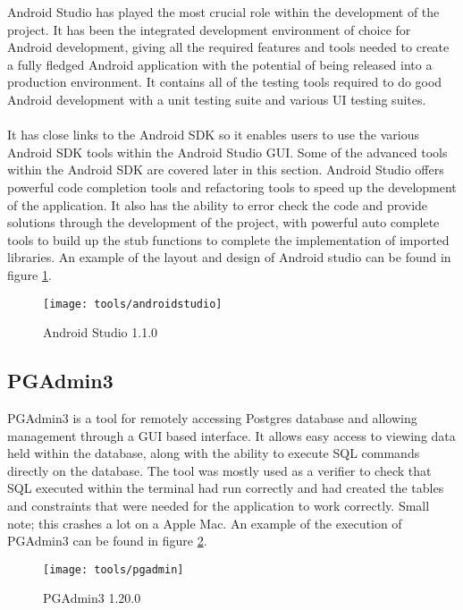 Android Studio has played the most crucial role within the development of the project. It has been the integrated development environment of choice for Android development, giving all the required features and tools needed to create a fully fledged Android application with the potential of being released into a production environment. It contains all of the testing tools required to do good Android development with a unit testing suite and various UI testing suites.\\
\\
It has close links to the Android SDK so it enables users to use the various Android SDK tools within the Android Studio GUI. Some of the advanced tools within the Android SDK are covered later in this section. Android Studio offers powerful code completion tools and refactoring tools to speed up the development of the application. It also has the ability to error check the code and provide solutions through the development of the project, with powerful auto complete tools to build up the stub functions to complete the implementation of imported libraries. An example of the layout and design of Android studio can be found in figure \ref{fig:android_studio_image}.

\begin{figure}[H]
    \centering
    \texttt{[image: tools/androidstudio]}
    \caption{Android Studio 1.1.0}
    \label{fig:android_studio_image}
\end{figure} 

\subsection{PGAdmin3}

PGAdmin3 is a tool for remotely accessing Postgres database and allowing management through a GUI based interface. It allows easy access to viewing data held within the database, along with the ability to execute SQL commands directly on the database. The tool was mostly used as a verifier to check that SQL executed within the terminal had run correctly and had created the tables and constraints that were needed for the application to work correctly. Small note; this crashes a lot on a Apple Mac. An example of the execution of PGAdmin3 can be found in figure \ref{fig:pg_admin_image}.

\begin{figure}[H]
    \centering
    \texttt{[image: tools/pgadmin]}
    \caption{PGAdmin3 1.20.0}
    \label{fig:pg_admin_image}
\end{figure} 

